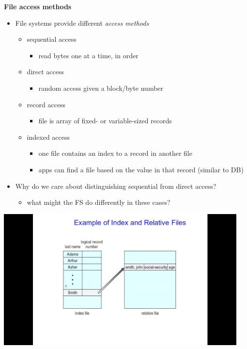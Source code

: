 \documentclass[11pt,a4paper]{article}
\begin{document}
\textbf{File access methods}
\begin{itemize}
    \item File systems provide different \emph{access methods}
        \begin{itemize}
            \item sequential access
                \begin{itemize}
                    \item read bytes one at a time, in order
                \end{itemize}
            \item direct access
                \begin{itemize}
                    \item random access given a block/byte number
                \end{itemize}
            \item record access
                \begin{itemize}
                    \item file is array of fixed- or variable-sized records
                \end{itemize}
            \item indexed access
                \begin{itemize}
                    \item one file contains an index to a record in another file
                    \item apps can find a file based on the value in that record (similar to DB)
                \end{itemize}
        \end{itemize}
    \item Why do we care about distinguishing sequential from direct access?
        \begin{itemize}
            \item what might the FS do differently in these cases?
        \end{itemize}
\end{itemize}

\includegraphics[height=270]{example-of-index-and-relative-files.jpg}
\end{document}
